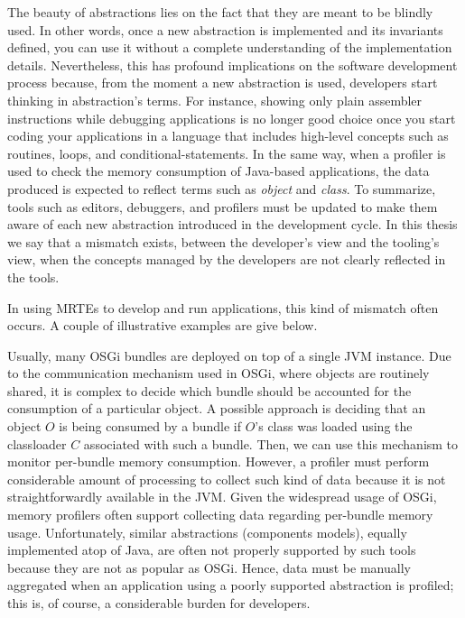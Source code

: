 The beauty of abstractions lies on the fact that they are meant to be blindly used.
In other words, once a new abstraction is implemented and its invariants defined, you can use it without a complete understanding of the implementation details.
Nevertheless, this has profound implications on the software development process because, from the moment a new abstraction is used, developers start thinking in abstraction's terms.
For instance, showing only plain assembler instructions while debugging applications is no longer good choice once you start coding your applications in a language that includes high-level concepts such as routines, loops, and conditional-statements.
In the same way, when a profiler is used to check the memory consumption of Java-based applications, the data produced is expected to reflect terms such as \textit{object} and \textit{class}.
To summarize, tools such as editors, debuggers, and profilers must be updated to make them aware of each new abstraction introduced in the development cycle.
In this thesis we say that a mismatch exists, between the developer's view and the tooling's view, when the concepts managed by the developers are not clearly reflected in the tools.

In using MRTEs to develop and run applications, this kind of mismatch often occurs.
A couple of illustrative examples are give below.

Usually, many OSGi bundles are deployed on top of a single JVM instance.
Due to the communication mechanism used in OSGi, where objects are routinely shared, it is complex to decide which bundle should be accounted for the consumption of a particular object.
A possible approach is deciding that an object $O$ is being consumed by a bundle if $O$'s class was loaded using the classloader $C$ associated with such a bundle.
Then, we can use this mechanism to monitor per-bundle memory consumption. 
However, a profiler must perform considerable amount of processing to collect such kind of data because it is not straightforwardly available in the JVM. 
Given the widespread usage of OSGi, memory profilers often support collecting data regarding per-bundle memory usage.
Unfortunately, similar abstractions (components models), equally implemented atop of Java, are often not properly supported by such tools because they are not as popular as OSGi.
Hence, data must be manually aggregated when an application using a poorly supported abstraction is profiled; this is, of course, a considerable burden for developers.

